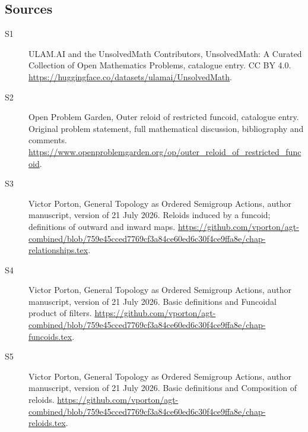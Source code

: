\documentclass[11pt]{article}
\begin{document}
\subsection{Sources}
\begin{description}
\item[\hypertarget{source:statement:1}{S1}] ULAM.AI and the UnsolvedMath Contributors, UnsolvedMath: A Curated Collection of Open Mathematics Problems, catalogue entry. CC BY 4.0. \url{https://huggingface.co/datasets/ulamai/UnsolvedMath}.
\item[\hypertarget{source:statement:2}{S2}] Open Problem Garden, Outer reloid of restricted funcoid, catalogue entry. Original problem statement, full mathematical discussion, bibliography and comments. \url{https://www.openproblemgarden.org/op/outer_reloid_of_restricted_funcoid}.
\item[\hypertarget{source:statement:3}{S3}] Victor Porton, General Topology as Ordered Semigroup Actions, author manuscript, version of 21 July 2026. Reloids induced by a funcoid; definitions of outward and inward maps. \url{https://github.com/vporton/agt-combined/blob/759e45cced7769cf3a84ce60ed6c30f4ce9ffa8e/chap-relationships.tex}.
\item[\hypertarget{source:statement:4}{S4}] Victor Porton, General Topology as Ordered Semigroup Actions, author manuscript, version of 21 July 2026. Basic definitions and Funcoidal product of filters. \url{https://github.com/vporton/agt-combined/blob/759e45cced7769cf3a84ce60ed6c30f4ce9ffa8e/chap-funcoids.tex}.
\item[\hypertarget{source:statement:5}{S5}] Victor Porton, General Topology as Ordered Semigroup Actions, author manuscript, version of 21 July 2026. Basic definitions and Composition of reloids. \url{https://github.com/vporton/agt-combined/blob/759e45cced7769cf3a84ce60ed6c30f4ce9ffa8e/chap-reloids.tex}.
\end{description}
\label{end:statement}
\end{document}
